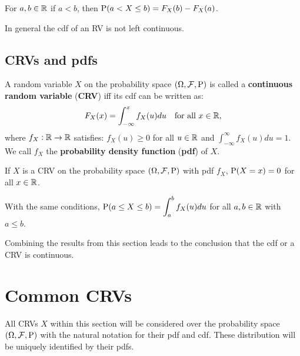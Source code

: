 \documentclass[../Year1/Year1.tex]{subfiles}
\begin{document}
\begin{theorem}
    For $a,b\in\RR$ if $a<b$, then $\P(a<X\leq b) = F_X(b)-F_X(a)$.
\end{theorem}

\begin{remark}
    In general the cdf of an RV is not left continuous.
\end{remark}

\subsection{CRVs and pdfs}
\begingroup\belowdisplayskip=-2pt
\begin{definition}
    A random variable $X$ on the probability space $(\Omega,\FFF,\P)$ is called a \textbf{continuous random variable} (\textbf{CRV}) iff its cdf can be written as: \[
        F_X(x) = \int_{-\infty}^xf_X(u)du \quad \text{\textcolor{black}{for all }$x\in\RR$}\textcolor{black}{,}
    \]
    where $f_X:\RR\rightarrow\RR$ satisfies: 
$f_X(u)\geq 0$ for all $u\in\RR$ and ${\displaystyle\int_{-\infty}^{\infty}f_X(u)du=1}$. We call $f_X$ the \textbf{probability density function} (\textbf{pdf}) of $X$.
\end{definition}
\endgroup

\begin{theorem}
    If $X$ is a CRV on the probability space $(\Omega,\FFF,\P)$ with pdf $f_X$, $\P(X=x)=0$ for all $x\in\RR$.
\end{theorem}

\begin{theorem}
    With the same conditions, $\P(a\leq X\leq b)={\displaystyle\int_a^bf_X(u)du}$ for all $a,b\in\RR$ with $a\leq b$.
\end{theorem}

\begin{remark}
    Combining the results from this section leads to the conclusion that the cdf or a CRV is continuous.
\end{remark}

\section{Common CRVs}
All CRVs $X$ within this section will be considered over the probability space $(\Omega, \FFF, \P)$ with the natural notation for their pdf and cdf. These distribution will be uniquely identified by their pdfs.
\end{document}
